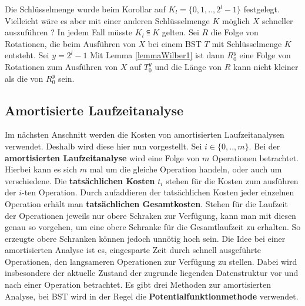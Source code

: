 \documentclass[a4paper,12pt]{article}
\begin{document}
\noindent Die Schlüsselmenge  wurde beim Korollar auf ${K_l = \{0,1,..,2^l -1\}}$ festgelegt. Vielleicht wäre es aber mit einer anderen Schlüsselmenge $K$ möglich $X$ schneller auszuführen ? In jedem Fall müsste $K_l \subseteqq K$ gelten. Sei $R$ die Folge von Rotationen, die beim Ausführen von $X$ bei einem BST $T$ mit Schlüsselmenge $K$ entsteht. Sei $y = 2^l -1$ Mit Lemma \ref{lemmaWilber1} ist dann $R_0^y$ eine Folge von Rotationen zum Ausführen von $X$ auf $T_0^y$ und die Länge von $R$ kann nicht kleiner als die von $R_0^y$ sein. 



\subsection{Amortisierte Laufzeitanalyse}
Im nächsten Anschnitt werden die Kosten von amortisierten Laufzeitanalysen verwendet. Deshalb wird diese hier nun vorgestellt.
Sei $i \in \{0,..,m\}$. Bei der \textbf{amortisierten Laufzeitanalyse} wird eine Folge von $m$ Operationen betrachtet. Hierbei kann es sich $m$ mal um die gleiche Operation handeln, oder auch um verschiedene. Die \textbf{tatsächlichen Kosten}  $t_i$ stehen für die Kosten zum ausführen der $i$-ten Operation. Durch aufaddieren der tatsächlichen Kosten jeder einzelnen Operation erhält man \textbf{tatsächlichen Gesamtkosten}.  Stehen für die Laufzeit der Operationen jeweils nur obere Schraken zur Verfügung, kann man mit diesen genau so vorgehen, um eine obere Schranke für die Gesamtlaufzeit zu erhalten. So erzeugte obere Schranken können jedoch unnötig hoch sein. Die Idee bei einer amortisierten Analyse ist es, eingesparte Zeit durch schnell ausgeführte Operationen, den langsameren Operationen zur Verfügung zu stellen. Dabei wird insbesondere der aktuelle Zustand der zugrunde liegenden Datenstruktur vor und nach einer Operation betrachtet. Es gibt drei Methoden zur amortisierten Analyse, bei BST wird in der Regel die \textbf{Potentialfunktionmethode} verwendet.
\end{document}
